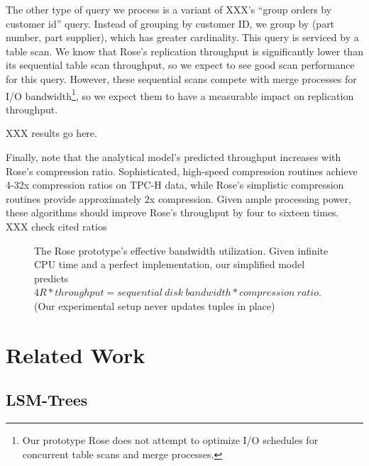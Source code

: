 \documentclass{vldb}
\newcommand{\rows}{Rose\xspace}
\newcommand{\rowss}{Rose's\xspace}
\begin{document}
The other type of query we process is a variant of XXX's ``group
orders by customer id'' query.  Instead of grouping by customer ID, we
group by (part number, part supplier), which has greater cardinality.
This query is serviced by a table scan.  We know that \rowss
replication throughput is significantly lower than its sequential
table scan throughput, so we expect to see good scan performance for
this query.  However, these sequential scans compete with merge
processes for I/O bandwidth\footnote{Our prototype \rows does not
  attempt to optimize I/O schedules for concurrent table scans and
  merge processes.}, so we expect them to have a measurable impact on
replication throughput.

XXX results go here.

Finally, note that the analytical model's predicted throughput
increases with \rowss compression ratio.  Sophisticated, high-speed
compression routines achieve 4-32x compression ratios on TPC-H data,
while \rowss simplistic compression routines provide approximately 2x
compression.  Given ample processing power, these algorithms should
improve \rowss throughput by four to sixteen times.  XXX check cited ratios


\begin{figure}
\centering
{}
\caption{The \rows prototype's effective bandwidth utilization.  Given
  infinite CPU time and a perfect implementation, our simplified model predicts $4R * throughput = sequential~disk~bandwidth *
  compression~ratio$.  (Our experimental setup never updates tuples in
  place)}
\label{fig:4R}
\end{figure}

\section{Related Work}

\subsection{LSM-Trees}
\end{document}
